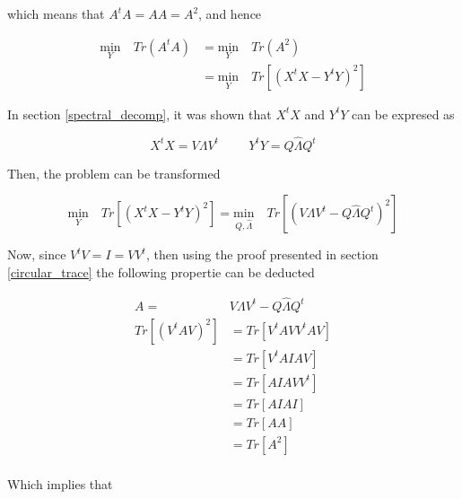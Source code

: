 \documentclass[12pt,journal]{IEEEtran}
\begin{document}
    which means that $A^tA = AA = A^2$, and hence

    \begin{equation*}
        \begin{aligned}
            \underset{Y}{\text{min}} \quad Tr(A^tA)
            &=
            \underset{Y}{\text{min}} \quad Tr(A^2)\\
            &=
            \underset{Y}{\text{min}} \quad Tr[(X^tX - Y^tY)^2]
        \end{aligned}
    \end{equation*}

    In section \ref{spectral_decomp}, it was shown that $X^tX$ and $Y^tY$ can be
    expresed as

    \begin{equation*}
        X^tX = V\Lambda V^t \hspace{1cm} Y^tY = Q \hat{\Lambda} Q^t
    \end{equation*}

    Then, the problem can be transformed

    \begin{equation*}
        \underset{Y}{\text{min}} \quad Tr[(X^tX - Y^tY)^2]
        =
        \underset{Q,\hat{\Lambda}}{\text{min}} \quad Tr[(V\Lambda V^t - Q \hat{\Lambda} Q^t)^2]
    \end{equation*}

    Now, since $V^tV = I = VV^t$, then using the proof presented in section
    \ref{circular_trace} the following propertie can be deducted

    \begin{equation*}
        \begin{aligned}
            A =& V\Lambda V^t - Q \hat{\Lambda} Q^t\\
            Tr[(V^tAV)^2] &= Tr[V^tAVV^tAV]\\
                          &= Tr[V^tAIAV]\\
                          &= Tr[AIAVV^t]\\
                          &= Tr[AIAI]\\
                          &= Tr[AA]\\
                          &= Tr[A^2]\\
        \end{aligned}
    \end{equation*}

    Which implies that
\end{document}

